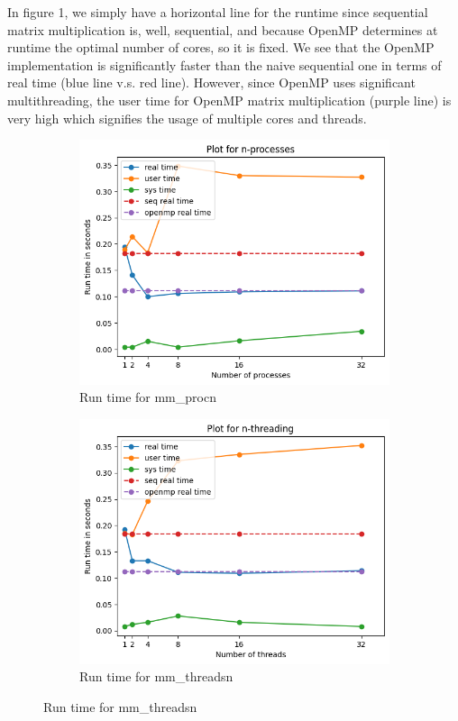 \documentclass{article}
\begin{document}
In figure 1, we simply have a horizontal line for the runtime since sequential matrix multiplication is, well, sequential, and because OpenMP determines at runtime the optimal number of cores, so it is fixed. We see that the OpenMP implementation is significantly faster than the naive sequential one in terms of real time (blue line v.s. red line). However, since OpenMP uses significant multithreading, the user time for OpenMP matrix multiplication (purple line) is very high which signifies the usage of multiple cores and threads.

  \begin{figure}[!h]
  \begin{subfigure}[t]{.5\textwidth}
    \centering    \includegraphics[width=\linewidth]{mm_procn.png}
    \caption {Run time for mm\_procn}
  \end{subfigure}
  \hfill
  \begin{subfigure}[t]{.5\textwidth}
    \centering
    \includegraphics[width=\linewidth]{mm_threadsn.png}
    \caption{Run time for mm\_threadsn}
  \end{subfigure}
\end{figure}
\end{document}
